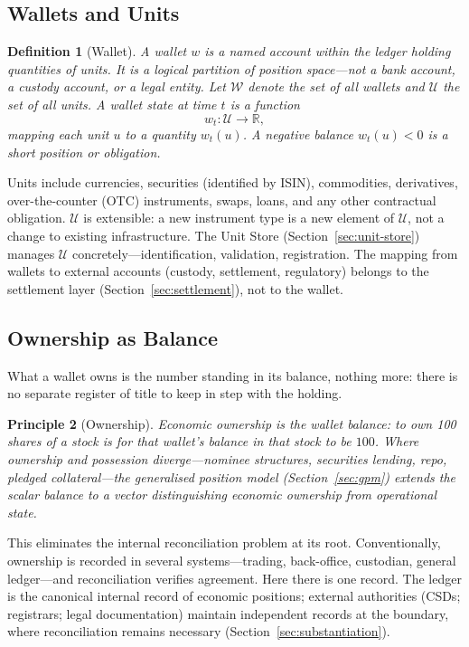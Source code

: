 \documentclass[11pt,a4paper]{article}
\newtheorem{definition}{Definition}[section]
\newtheorem{principle}[definition]{Principle}
\begin{document}
\subsection{Wallets and Units}

\begin{definition}[Wallet]
A wallet $w$ is a named account within the ledger holding quantities of units. It is a logical partition of position space---not a bank account, a custody account, or a legal entity. Let $\mathcal{W}$ denote the set of all wallets and $\mathcal{U}$ the set of all units. A wallet state at time $t$ is a function
\[
w_t : \mathcal{U} \to \mathbb{R},
\]
mapping each unit $u$ to a quantity $w_t(u)$. A negative balance $w_t(u) < 0$ is a short position or obligation.
\end{definition}

Units include currencies, securities (identified by ISIN), commodities, derivatives, over-the-counter (OTC) instruments, swaps, loans, and any other contractual obligation. $\mathcal{U}$ is extensible: a new instrument type is a new element of $\mathcal{U}$, not a change to existing infrastructure. The Unit Store (Section~\ref{sec:unit-store}) manages $\mathcal{U}$ concretely---identification, validation, registration. The mapping from wallets to external accounts (custody, settlement, regulatory) belongs to the settlement layer (Section~\ref{sec:settlement}), not to the wallet.

\subsection{Ownership as Balance}

What a wallet owns is the number standing in its balance, nothing more: there is no separate register of title to keep in step with the holding.

\begin{principle}[Ownership]
Economic ownership is the wallet balance: to own 100 shares of a stock is for that wallet's balance in that stock to be $100$. Where ownership and possession diverge---nominee structures, securities lending, repo, pledged collateral---the generalised position model (Section~\ref{sec:gpm}) extends the scalar balance to a vector distinguishing economic ownership from operational state.
\end{principle}

This eliminates the internal reconciliation problem at its root. Conventionally, ownership is recorded in several systems---trading, back-office, custodian, general ledger---and reconciliation verifies agreement. Here there is one record. The ledger is the canonical internal record of economic positions; external authorities (CSDs; registrars; legal documentation) maintain independent records at the boundary, where reconciliation remains necessary (Section~\ref{sec:substantiation}).
\end{document}

